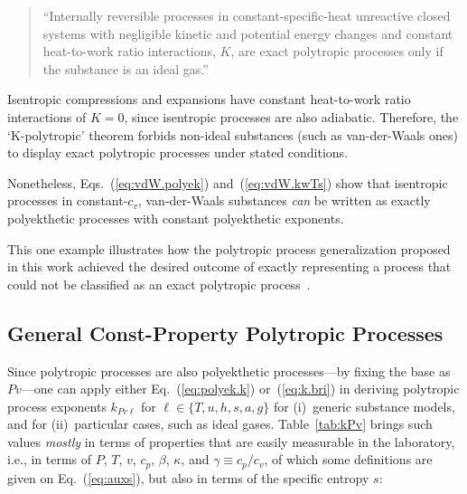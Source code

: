     \begin{quote}
        ``Internally reversible processes in constant-specific-heat  unreactive  closed  systems
        with negligible kinetic and potential energy changes  and  constant  heat-to-work  ratio
        interactions, $K$, are exact polytropic processes only if  the  substance  is  an  ideal
        gas.''
    \end{quote}

    Isentropic compressions and expansions have  constant  heat-to-work  ratio  interactions  of
    $K=0$, since isentropic processes are also adiabatic. Therefore, the `K-polytropic'  theorem
    forbids non-ideal substances (such  as  van-der-Waals  ones)  to  display  exact  polytropic
    processes under stated conditions.

    Nonetheless,  Eqs.~(\ref{eq:vdW.polyek})  and~(\ref{eq:vdW.kwTs})   show   that   isentropic
    processes in constant-$c_v$, van-der-Waals  substances  \emph{can}  be  written  as  exactly
    polyekthetic processes with constant polyekthetic exponents.

    This one example illustrates how the polytropic process generalization proposed in this work
    achieved the desired outcome of exactly representing a process that could not be  classified
    as an exact polytropic process~\cite{2020-NaaktgeborenC-engrXiv}.

    \subsection{General Const-Property Polytropic Processes}

    Since  polytropic  processes  are  also  polyekthetic  processes---by  fixing  the  base  as
    $Pv$---one  can  apply  either  Eq.~(\ref{eq:polyek.k})  or~(\ref{eq:k.bri})   in   deriving
    polytropic process exponents  $k_{Pv\ell}$  for  $\ell  \in  \{T,  u,  h,  s,  a,  g\}$  for
    (i)~generic  substance  models,  and  for  (ii)~particular  cases,  such  as  ideal   gases.
    Table~\ref{tab:kPv} brings such values \emph{mostly} in terms of properties that are  easily
    measurable in the laboratory, i.e., in terms of $P$, $T$, $v$, $c_p$, $\beta$, $\kappa$, and
    $\gamma \equiv c_p / c_v$, of which some definitions are given on  Eq.~(\ref{eq:auxs}),  but
    also in terms of the specific entropy $s$:

